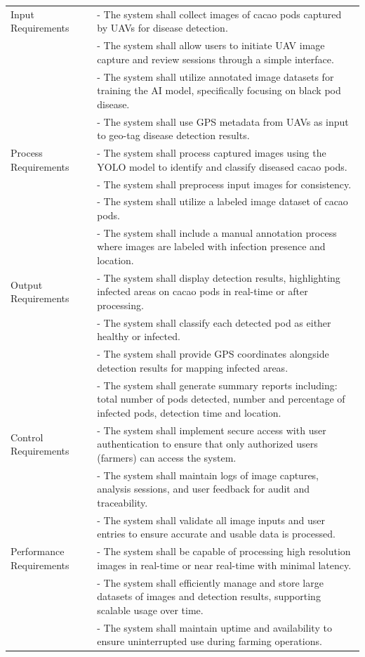 \begin{longtable}{p{4cm} p{8cm}}
    Input Requirements & - The system shall collect images of cacao pods captured by UAVs for disease detection. \\
     & - The system shall allow users to initiate UAV image capture and review sessions through a simple interface. \\
      & - The system shall utilize annotated image datasets for training the AI model, specifically focusing on black pod disease. \\
       & - The system shall use GPS metadata from UAVs as input to geo-tag disease detection results. \\
       \midrule
    Process Requirements & - The system shall process captured images using the YOLO model to identify and classify diseased cacao pods. \\
     & - The system shall preprocess input images for consistency. \\
      & - The system shall utilize a labeled image dataset of cacao pods. \\
       & - The system shall include a manual annotation process where images are labeled with infection presence and location. \\
       \midrule
    Output Requirements & - The system shall display detection results, highlighting infected areas on cacao pods in real-time or after processing. \\
     & - The system shall classify each detected pod as either healthy or infected. \\
      & - The system shall provide GPS coordinates alongside detection results for mapping infected areas. \\
       & - The system shall generate summary reports including: total number of pods detected, number and percentage of infected pods, detection time and location. \\
       \midrule
    Control Requirements & - The system shall implement secure access with user authentication to ensure that only authorized users (farmers) can access the system. \\
     & - The system shall maintain logs of image captures, analysis sessions, and user feedback for audit and traceability. \\
      & - The system shall validate all image inputs and user entries to ensure accurate and usable data is processed. \\
      \midrule
    Performance Requirements & - The system shall be capable of processing high resolution images in real-time or near real-time with minimal latency. \\
     & - The system shall efficiently manage and store large datasets of images and detection results, supporting scalable usage over time. \\
      & - The system shall maintain uptime and availability to ensure uninterrupted use during farming operations. \\
  \end{longtable}
